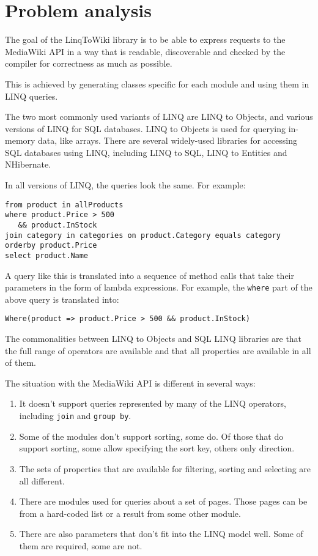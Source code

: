 \chapter{Problem analysis}
\label{goal}

The goal of the LinqToWiki library is to be able to express requests to the MediaWiki API
in a way that is readable, discoverable and checked by the compiler for correctness as much as possible.

This is achieved by generating classes specific for each module and using them in LINQ queries.

The two most commonly used variants of LINQ are LINQ to Objects, and various versions of LINQ for SQL databases.
LINQ to Objects is used for querying in-memory data, like arrays.
There are several widely-used libraries for accessing SQL databases using LINQ, including LINQ to SQL, LINQ to Entities and NHibernate.

In all versions of LINQ, the queries look the same. For example:

\begin{lstlisting}
from product in allProducts
where product.Price > 500
   && product.InStock
join category in categories on product.Category equals category
orderby product.Price
select product.Name
\end{lstlisting}

A query like this is translated into a sequence of method calls that take their parameters in the form of lambda expressions.
For example, the \lstinline{where} part of the above query is translated into:

\begin{lstlisting}
Where(product => product.Price > 500 && product.InStock)
\end{lstlisting}

The commonalities between LINQ to Objects and SQL LINQ libraries are that the full range of operators are available
and that all properties are available in all of them.

The situation with the MediaWiki API is different in several ways:

\begin{enumerate}
\item It doesn't support queries represented by many of the LINQ operators, including \lstinline{join} and \lstinline{group by}.
\item Some of the modules don't support sorting, some do. Of those that do support sorting, some allow specifying the sort key, others only direction.
\item The sets of properties that are available for filtering, sorting and selecting are all different.
\item There are modules used for queries about a set of pages. Those pages can be from a hard-coded list or a result from some other module.
\item There are also parameters that don't fit into the LINQ model well. Some of them are required, some are not.
\end{enumerate}

